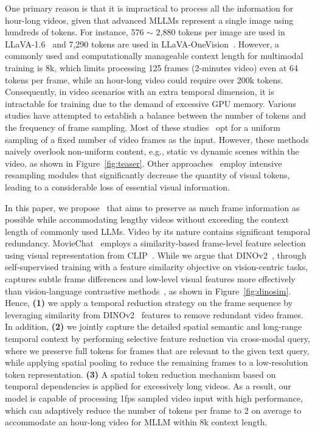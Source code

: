 One primary reason is that it is impractical to process all the information for hour-long videos, given that advanced MLLMs represent a single image using hundreds of tokens. For instance, 576 $\sim$ 2,880 tokens per image are used in LLaVA-1.6~\citep{liu2024llavanext} and 7,290 tokens are used in LLaVA-OneVision~\citep{li2024llava}. However, a commonly used and computationally manageable context length for multimodal training is 8k, which limits processing 125 frames (2-minutes video) even at 64 tokens per frame, while an hour-long video could require over 200k tokens. Consequently, in video scenarios with an extra temporal dimension, it is intractable for training due to the demand of excessive GPU memory. Various studies have attempted to establish a balance between the number of tokens and the frequency of frame sampling. Most of these studies~\citep{li2024llava,cheng2024videollama,zhang2024llavanextvideo,chen2024sharegpt4video} opt for a uniform sampling of a fixed number of video frames as the input. However, these methods naively overlook non-uniform content, e.g., static vs dynamic scenes within the video, as shown in Figure~\ref{fig:teaser}. Other approaches~\citep{li2023videochat,li2023llama,jin2023chatunivi} employ intensive resampling modules that significantly decrease the quantity of visual tokens, leading to a considerable loss of essential visual information.

In this paper, we propose \modelname~that aims to preserve as much frame information as possible while accommodating lengthy videos without exceeding the context length of commonly used LLMs. Video by its nature contains significant temporal redundancy. MovieChat~\citep{song2024moviechat} employs a similarity-based frame-level feature selection using visual representation from CLIP~\citep{radford2021learning}. While we argue that DINOv2~\citep{oquab2023dinov2}, through self-supervised training with a feature similarity objective on vision-centric tasks, captures subtle frame differences and low-level visual features more effectively than vision-language contrastive methods~\citep{radford2021learning,zhai2023sigmoid}, as shown in Figure~\ref{fig:dinosim}. Hence, \textbf{(1)} we apply a temporal reduction strategy on the frame sequence by leveraging similarity from DINOv2~\citep{oquab2023dinov2} features to remove redundant video frames. In addition, \textbf{(2)} we jointly capture the detailed spatial semantic and long-range temporal context by performing selective feature reduction via cross-modal query, where we preserve full tokens for frames that are relevant to the given text query, while applying spatial pooling to reduce the remaining frames to a low-resolution token representation. \textbf{(3)} A spatial token reduction mechanism based on temporal dependencies is applied for excessively long videos. As a result, our model is capable of processing 1fps sampled video input with high performance, which can adaptively reduce the number of tokens per frame to 2 on average to accommodate an hour-long video for MLLM within 8k context length.

